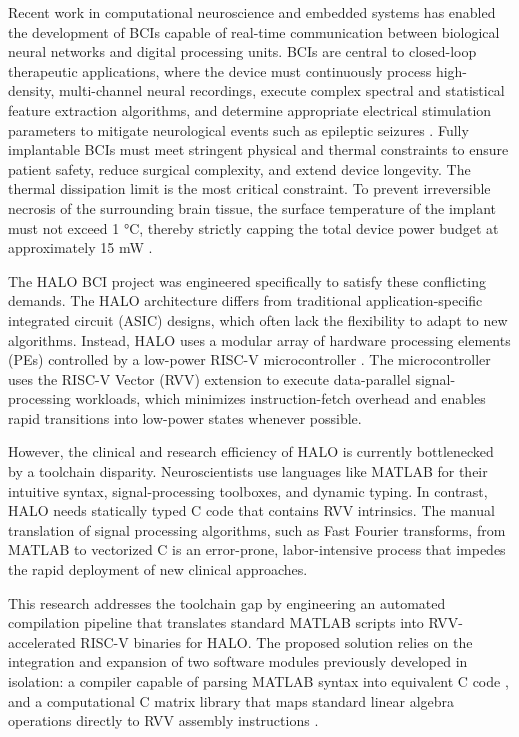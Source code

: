 Recent work in computational neuroscience and embedded systems has enabled the development of BCIs capable of real-time communication between biological neural networks and digital processing units. BCIs are central to closed-loop therapeutic applications, where the device must continuously process high-density, multi-channel neural recordings, execute complex spectral and statistical feature extraction algorithms, and determine appropriate electrical stimulation parameters to mitigate neurological events such as epileptic seizures \cite{9138938}. Fully implantable BCIs must meet stringent physical and thermal constraints to ensure patient safety, reduce surgical complexity, and extend device longevity. The thermal dissipation limit is the most critical constraint. To prevent irreversible necrosis of the surrounding brain tissue, the surface temperature of the implant must not exceed 1 °C, thereby strictly capping the total device power budget at approximately 15 mW \cite{10120914}.

The HALO BCI project was engineered specifically to satisfy these conflicting demands. The HALO architecture differs from traditional application-specific integrated circuit (ASIC) designs, which often lack the flexibility to adapt to new algorithms. Instead, HALO uses a modular array of hardware processing elements (PEs) controlled by a low-power RISC-V microcontroller \cite{9138938}. The microcontroller uses the RISC-V Vector (RVV) extension to execute data-parallel signal-processing workloads, which minimizes instruction-fetch overhead and enables rapid transitions into low-power states whenever possible. 

However, the clinical and research efficiency of HALO is currently bottlenecked by a toolchain disparity. Neuroscientists use languages like MATLAB for their intuitive syntax, signal-processing toolboxes, and dynamic typing. In contrast, HALO needs statically typed C code that contains RVV intrinsics. The manual translation of signal processing algorithms, such as Fast Fourier transforms, from MATLAB to vectorized C is an error-prone, labor-intensive process that impedes the rapid deployment of new clinical approaches. 

This research addresses the toolchain gap by engineering an automated compilation pipeline that translates standard MATLAB scripts into RVV-accelerated RISC-V binaries for HALO. The proposed solution relies on the integration and expansion of two software modules previously developed in isolation: a compiler capable of parsing MATLAB syntax into equivalent C code \cite{ts}, and a computational C matrix library that maps standard linear algebra operations directly to RVV assembly instructions \cite{riscvmatrix}.


